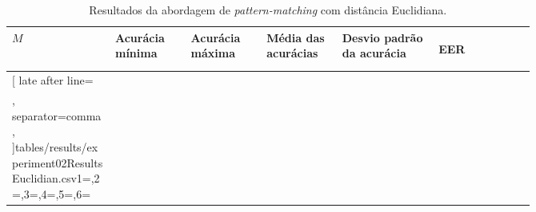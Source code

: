 \begin{table}[H]
	\newcommand{\mc}[3]{\multicolumn{#1}{#2}{#3}}
	\begin{center}
		\begin{tabular}{|p{0.15\linewidth}|p{0.11\linewidth}|p{0.11\linewidth}|p{0.11\linewidth}|p{0.14\linewidth}|p{0.14\linewidth}|}\hline
			\rowcolor{tcA}
			\centering\textbf{$M$} & \centering\textbf{Acurácia mínima} & \centering\textbf{Acurácia máxima} & \centering\textbf{Média das acurácias} & \centering\textbf{Desvio padrão da acurácia} & \begin{center}\textbf{EER}\end{center}\\\hline

			\rowcolor{tcB}
			\csvreader[
			late after line=\\\hline\rowcolor{tcB},%
			separator=comma,
			]{tables/results/experiment02ResultsEuclidian.csv}{1=\eme,2=\minAccu,3=\maxAccu,4=\meanAccu,5=\stdDev,6=\eer}{\centering\eme\% & \centering\StrSubstitute[0]{\minAccu}{.}{,} & \centering\StrSubstitute[0]{\maxAccu}{.}{,} & \centering\StrSubstitute[0]{\meanAccu}{.}{,} & \centering\StrSubstitute[0]{\stdDev}{.}{,} & \StrSubstitute[0]{\eer}{.}{,}}

		\end{tabular}
	\end{center}
	\caption{Resultados da abordagem de \textit{pattern-matching} com distância Euclidiana.}
	\label{tab:experiment02ResultsEuclidian}
\end{table}

